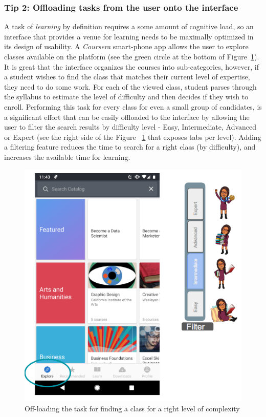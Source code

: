 \documentclass[12pt,letterpaper]{article}
\begin{document}
\subsubsection*{Tip 2: Offloading tasks from the user onto the interface}
A task of \textit{learning} by definition requires a some amount of cognitive load, so an interface that provides a venue for learning needs to be maximally optimized in its design of usability. A \textit{Coursera} smart-phone app allows the user to explore classes available on the platform (see the green circle at the bottom of Figure~\ref{fig::5}). It is great that the interface organizes the courses into sub-categories, however, if a student wishes to find the class that matches their current level of expertise, they need to do some work. For each of the viewed class, student parses through the syllabus to estimate the level of difficulty and then decides if they wish to enroll. Performing this task for every class for even a small group of candidates, is a significant effort that can be easily offloaded to the interface by allowing the user to filter the search results by difficulty level - Easy, Intermediate, Advanced or Expert (see the right side of the Figure ~\ref{fig::5} that exposes tabs per level). Adding a filtering feature reduces the time to search for a right class (by difficulty), and increases the available time for learning. 

\begin{figure}[h]
\centering
\includegraphics[scale=.4]{figures/p2/coursera_filter.png}
\caption{Off-loading the task for finding a class for a right level of complexity}
\label{fig::5}
\end{figure}

 

\end{document}
